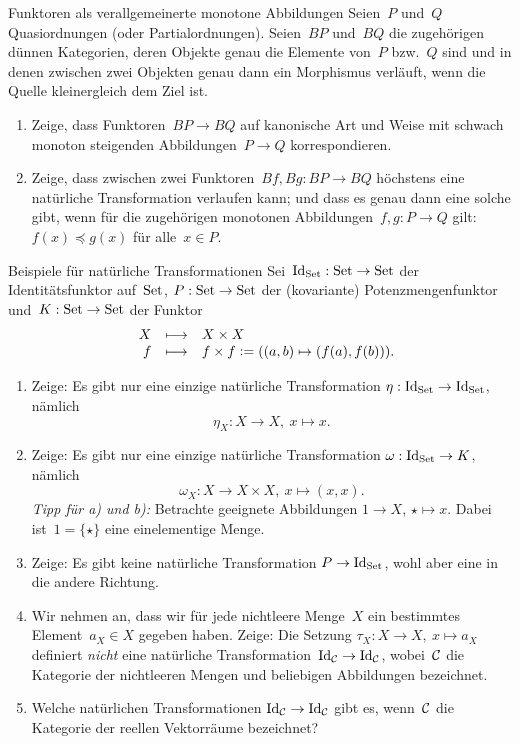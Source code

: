 \documentclass{uebblatt}
\begin{document}

\begin{aufgabe}{Funktoren als verallgemeinerte monotone Abbildungen}
Seien~$P$ und~$Q$ Quasiordnungen (oder Partialordnungen). Seien~$BP$ und~$BQ$
die zugehörigen dünnen Kategorien, deren Objekte genau die Elemente von~$P$ bzw.~$Q$
sind und in denen zwischen zwei Objekten genau dann ein Morphismus verläuft,
wenn die Quelle kleinergleich dem Ziel ist.

\begin{enumerate}
\item Zeige, dass Funktoren~$BP \to BQ$ auf kanonische Art und Weise mit
schwach monoton steigenden Abbildungen~$P \to Q$ korrespondieren.
\item Zeige, dass zwischen zwei Funktoren~$Bf, Bg : BP \to BQ$ höchstens eine
natürliche Transformation verlaufen kann; und dass es genau dann eine solche
gibt, wenn für die zugehörigen monotonen Abbildungen~$f, g : P \to Q$ gilt:
$f(x) \preceq g(x)$ für alle~$x \in P$.
\end{enumerate}
\end{aufgabe}

\begin{aufgabe}{Beispiele für natürliche Transformationen}
Sei~$\mathrm{Id}_{\mathrm{Set}} : \mathrm{Set} \to \mathrm{Set}$ der Identitätsfunktor auf~$\mathrm{Set}$, $P : \mathrm{Set} \to
\mathrm{Set}$ der (kovariante) Potenzmengenfunktor und~$K : \mathrm{Set}
\to \mathrm{Set}$ der Funktor
\[ \begin{array}{@{}rrcl@{}}
  & X &\longmapsto& X \times X \\
  & f &\longmapsto& f \times f \defeq ((a,b) \mapsto (f(a),f(b))).
\end{array} \]
\begin{enumerate}
\item
Zeige: Es gibt nur eine einzige natürliche Transformation $\eta : \mathrm{Id}_{\mathrm{Set}}
\to \mathrm{Id}_{\mathrm{Set}}$, nämlich
\[ \eta_X : X \to X,\ x \mapsto x. \]
\item
Zeige: Es gibt nur eine einzige natürliche Transformation $\omega : \mathrm{Id}_{\mathrm{Set}}
\to K$, nämlich
\[ \omega_X : X \to X \times X,\ x \mapsto (x,x). \]
\emph{Tipp für a) und b):} Betrachte geeignete Abbildungen $1 \to X$, $\star
\mapsto x$. Dabei ist~$1 = \{\star\}$ eine einelementige Menge.
\item
Zeige: Es gibt keine natürliche Transformation $P \to \mathrm{Id}_{\mathrm{Set}}$, wohl
aber eine in die andere Richtung.
\item Wir nehmen an, dass wir für jede nichtleere Menge~$X$ ein bestimmtes
Element~$a_X \in X$ gegeben haben. Zeige:
Die Setzung
$\tau_X : X \to X,\ x \mapsto a_X$
definiert \emph{nicht} eine natürliche Transformation~$\mathrm{Id}_{\mathcal{C}} \to \mathrm{Id}_{\mathcal{C}}$,
wobei~$\mathcal{C}$ die Kategorie der nichtleeren Mengen und beliebigen Abbildungen
bezeichnet.
\item
Welche natürlichen Transformationen $\mathrm{Id}_{\mathcal{C}} \to \mathrm{Id}_{\mathcal{C}}$ gibt es,
wenn~$\mathcal{C}$ die Kategorie der reellen Vektorräume bezeichnet?
\end{enumerate}
\end{aufgabe}
\end{document}
